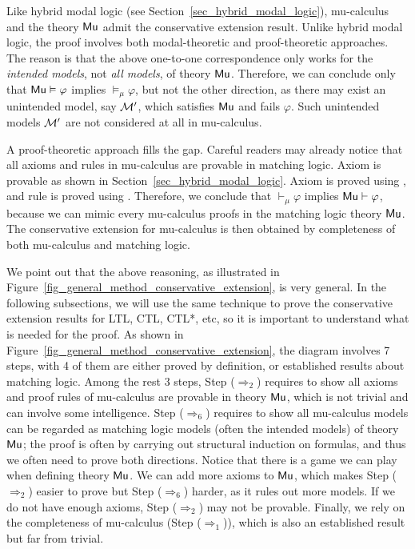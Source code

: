 \documentclass{amsart}
\begin{document}
Like hybrid modal logic (see Section~\ref{sec_hybrid_modal_logic}), 
mu-calculus and the theory $\mathsf{Mu}$
admit the conservative extension result.
Unlike hybrid modal logic, the proof involves
both modal-theoretic and proof-theoretic approaches.
The reason is that the above one-to-one correspondence only works for
the \emph{intended models}, not \emph{all models}, of theory $\mathsf{Mu}$.
Therefore, we can conclude only
that $\mathsf{Mu} \vDash \varphi$ implies $\vDash_\mu \varphi$,
but not the other direction, as there may exist an unintended model, say $\mathcal{M}'$,
which satisfies $\mathsf{Mu}$ and fails $\varphi$.
Such unintended models $\mathcal{M}'$ are not considered at all in mu-calculus.

A proof-theoretic approach fills the gap.
Careful readers may already notice that 
all axioms and rules in mu-calculus are provable in matching logic.
Axiom  is provable as shown in Section~\ref{sec_hybrid_modal_logic}.
Axiom  is proved using \Fixmu,
and rule  is proved using \Lfp.
Therefore, we conclude that $\vdash_\mu \varphi$ implies $\mathsf{Mu} \vdash \varphi$,
because we can mimic every mu-calculus proofs in the matching logic theory $\mathsf{Mu}$.
The conservative extension for mu-calculus is then obtained by 
completeness of both mu-calculus and matching logic.

We point out that the above reasoning,
as illustrated in Figure~\ref{fig_general_method_conservative_extension},
is very general.
In the following subsections, 
we will use the same technique to prove
the conservative extension results for LTL, CTL, CTL*, etc,
so it is important to understand what is needed for the proof.
As shown in Figure~\ref{fig_general_method_conservative_extension},
the diagram involves 7 steps, with 4 of them are either proved by definition,
or established results about matching logic.
Among the rest 3 steps,
Step ($\Longrightarrow_2$) requires to show all axioms and proof rules of mu-calculus
are provable in theory $\mathsf{Mu}$, 
which is not trivial and can involve some intelligence.
Step ($\Longrightarrow_6$) requires to show all mu-calculus models can be regarded as
matching logic models (often the intended models) of theory $\mathsf{Mu}$;
the proof is often by carrying out structural induction on formulas,
and thus we often need to prove both directions.
Notice that there is a game we can play when defining theory $\mathsf{Mu}$.
We can add more axioms to $\mathsf{Mu}$, which makes Step ($\Longrightarrow_2$) easier to prove
but Step ($\Longrightarrow_6$) harder, as it rules out more models.
If we do not have enough axioms, Step ($\Longrightarrow_2$) may not be provable.
Finally, we rely on the completeness of mu-calculus (Step ($\Longrightarrow_1$)),
which is also an established result but far from trivial.
\end{document}

